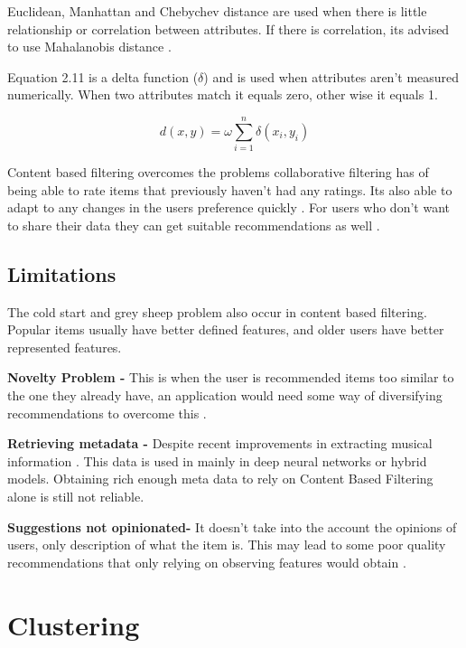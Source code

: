 Euclidean, Manhattan and Chebychev distance are used when there is little relationship or correlation between attributes. If there is correlation, its advised to use Mahalanobis distance \citep{celma_recommendation_2010}.

Equation 2.11 is a delta function ($\delta $) and is used when attributes aren't measured numerically. When two attributes match it equals zero, other wise it equals 1.

\begin{equation}
	d(x,y) = \omega \sum _{ i = 1 } ^{ n } \delta (x _{i}, y _{i})
\end{equation}

Content based filtering overcomes the problems collaborative filtering has of being able to rate items that previously haven't had any ratings. Its also able to adapt to any changes in the users preference quickly \citep{isinkaye_recommendation_2015}. For users who don't want to share their data they can get suitable recommendations as well \citep{k_you_2006}.

\subsection{Limitations}
The cold start and grey sheep problem also occur in content based filtering. Popular items usually have better defined features, and older users have better represented features.

\textbf{Novelty Problem - } This is when the user is recommended items too similar to the one they already have, an application would need some way of diversifying recommendations to overcome this \citep{celma_recommendation_2010}.

\textbf{Retrieving metadata - } Despite recent improvements in extracting musical information \citep{vall_feature-combination_2019, singh_novel_2022}. This data is used in mainly in deep neural networks or hybrid models. Obtaining rich enough meta data to rely on Content Based Filtering alone is still not reliable.

\textbf{Suggestions not opinionated- } It doesn't take into the account the opinions of users, only description of what the item is. This may lead to some poor quality recommendations that only relying on observing features would obtain \citep{celma_recommendation_2010}.  

\section{Clustering}

